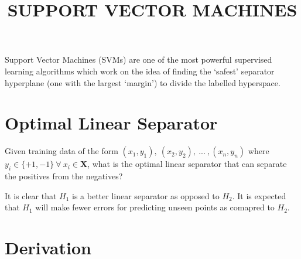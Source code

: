 \documentclass[11pt, a4paper]{article}
\begin{document}
\title{SUPPORT VECTOR MACHINES}
\date{}
\maketitle

Support Vector Machines (SVMs) are one of the most powerful supervised learning algorithms which work on the idea of finding the `safest' separator hyperplane (one with the largest `margin') to divide the labelled hyperspace.

\section{Optimal Linear Separator}

Given training data of the form $(x_1, y_1),\ (x_2, y_2),\ ...\ , (x_n, y_n)$ where $y_i \in \{+1, -1\}\ \forall\ x_i \in \mathbf{X}$, what is the optimal linear separator that can separate the positives from the negatives?

\begin{figure}[htbp]
	\centering
\end{figure}

It is clear that $H_1$ is a better linear separator as opposed to $H_2$. It is expected that $H_1$ will make fewer errors for predicting unseen points as comapred to $H_2$.

\section{Derivation}
\end{document}

